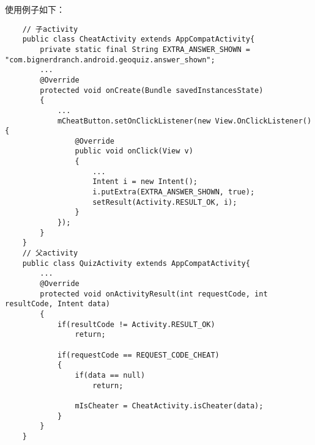 \documentclass[a4paper,left=2.5cm,right=2.5cm,11pt]{article}
\begin{document}
	使用例子如下：
	\begin{lstlisting}
	// 子activity
	public class CheatActivity extends AppCompatActivity{
		private static final String EXTRA_ANSWER_SHOWN = "com.bignerdranch.android.geoquiz.answer_shown";
		...
		@Override
		protected void onCreate(Bundle savedInstancesState)
		{
			...
			mCheatButton.setOnClickListener(new View.OnClickListener(){
				@Override
				public void onClick(View v)
				{
					...
					Intent i = new Intent();
					i.putExtra(EXTRA_ANSWER_SHOWN, true);
					setResult(Activity.RESULT_OK, i);
				}
			});
		}
	}
	// 父activity
	public class QuizActivity extends AppCompatActivity{
		...
		@Override
		protected void onActivityResult(int requestCode, int resultCode, Intent data)
		{
			if(resultCode != Activity.RESULT_OK)
				return;

			if(requestCode == REQUEST_CODE_CHEAT)
			{
				if(data == null)
					return;

				mIsCheater = CheatActivity.isCheater(data);
			}
		}
	}
	\end{lstlisting}
\end{document}
